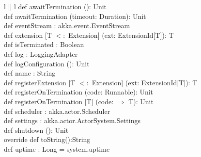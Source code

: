 \begin{table}[h]
\begin{tabular}{ l ||  l }
 {\hspace{4 cm}def awaitTermination (): Unit}\\
 {\hspace{4 cm}def awaitTermination (timeout: Duration): Unit }\\
 {\hspace{4 cm}def eventStream : akka.event.EventStream}\\
 {\hspace{4 cm}def extension [T $<:$ Extension] (ext: ExtensionId[T]): T }\\
 {\hspace{4 cm}def isTerminated : Boolean}\\
 {\hspace{4 cm}def log : LoggingAdapter }\\
 {\hspace{4 cm}def logConfiguration (): Unit}\\
 {\hspace{4 cm}def name : String}\\
 {\hspace{4 cm}def registerExtension [T $<:$ Extension] (ext: ExtensionId[T]): T  }\\
 {\hspace{4 cm}def registerOnTermination (code: Runnable): Unit}\\
 {\hspace{4 cm}def registerOnTermination [T] (code: $\Rightarrow$ T): Unit}\\
 {\hspace{4 cm}def scheduler : akka.actor.Scheduler}\\
 {\hspace{4 cm}def settings : akka.actor.ActorSystem.Settings}\\
 {\hspace{4 cm}def shutdown (): Unit}\\
 {\hspace{4 cm}override def toString():String}\\
 {\hspace{4 cm}def uptime : Long = system.uptime }\\


  \end{tabular}
\end{table}


